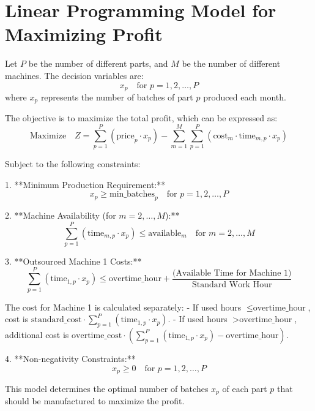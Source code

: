 \documentclass{article}
\begin{document}
\section*{Linear Programming Model for Maximizing Profit}

Let \( P \) be the number of different parts, and \( M \) be the number of different machines. The decision variables are:
\[
x_p \quad \text{for } p = 1, 2, \ldots, P
\]
where \( x_p \) represents the number of batches of part \( p \) produced each month.

The objective is to maximize the total profit, which can be expressed as:
\[
\text{Maximize} \quad Z = \sum_{p=1}^{P} \left( \text{price}_p \cdot x_p \right) - \sum_{m=1}^{M} \sum_{p=1}^{P} \left( \text{cost}_m \cdot \text{time}_{m,p} \cdot x_p \right)
\]

Subject to the following constraints:

1. **Minimum Production Requirement:**
   \[
   x_p \geq \text{min\_batches}_p \quad \text{for } p = 1, 2, \ldots, P
   \]

2. **Machine Availability (for \( m = 2, \ldots, M \)):**
   \[
   \sum_{p=1}^{P} \left( \text{time}_{m,p} \cdot x_p \right) \leq \text{available}_m \quad \text{for } m = 2, \ldots, M
   \]

3. **Outsourced Machine 1 Costs:**
   \[
   \sum_{p=1}^{P} \left( \text{time}_{1,p} \cdot x_p \right) \leq \text{overtime\_hour} + \frac{\text{(Available Time for Machine 1)}}{\text{Standard Work Hour}}
   \]

   The cost for Machine 1 is calculated separately:
   - If used hours \( \leq \text{overtime\_hour} \), cost is \(\text{standard\_cost} \cdot \sum_{p=1}^{P} \left( \text{time}_{1,p} \cdot x_p \right)\).
   - If used hours \( > \text{overtime\_hour} \), additional cost is \(\text{overtime\_cost} \cdot \left( \sum_{p=1}^{P} \left( \text{time}_{1,p} \cdot x_p \right) - \text{overtime\_hour} \right)\).

4. **Non-negativity Constraints:**
   \[
   x_p \geq 0 \quad \text{for } p = 1, 2, \ldots, P
   \]

This model determines the optimal number of batches \( x_p \) of each part \( p \) that should be manufactured to maximize the profit.
\end{document}
